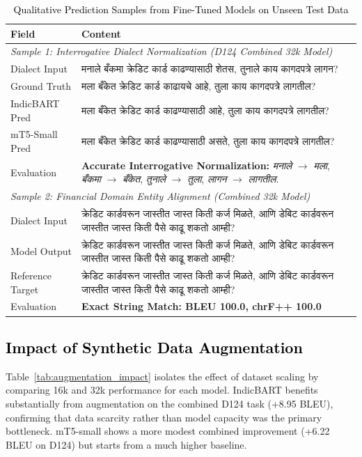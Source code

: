 \begin{table}[t]
\color{black}
\centering
\caption{\textcolor{black}{Qualitative Prediction Samples from Fine-Tuned Models on Unseen Test Data}}
\label{tab:qualitative}
\begin{tabularx}{\textwidth}{lX}
\hline
\textbf{Field} & \textbf{Content} \\
\hline
\multicolumn{2}{l}{\textit{Sample 1: Interrogative Dialect Normalization (D124 Combined 32k Model)}} \\
\hline
Dialect Input & मनाले बँकमा क्रेडिट कार्ड काढण्यासाठी शेतस, तुनाले काय कागदपत्रे लागन? \\
Ground Truth & मला बँकेत क्रेडिट कार्ड काढायचे आहे, तुला काय कागदपत्रे लागतील? \\
IndicBART Pred & मला बँकेत क्रेडिट कार्ड काढण्यासाठी आहे, तुला काय कागदपत्रे लागतील? \\
mT5-Small Pred & मला बँकेत क्रेडिट कार्ड काढण्यासाठी असते, तुला काय कागदपत्रे लागतील? \\
Evaluation & \textbf{Accurate Interrogative Normalization:} \emph{मनाले} $\rightarrow$ \emph{मला}, \emph{बँकमा} $\rightarrow$ \emph{बँकेत}, \emph{तुनाले} $\rightarrow$ \emph{तुला}, \emph{लागन} $\rightarrow$ \emph{लागतील}. \\
\hline
\multicolumn{2}{l}{\textit{Sample 2: Financial Domain Entity Alignment (Combined 32k Model)}} \\
\hline
Dialect Input & क्रेडिट कार्डवरून जास्तीत जास्त किती कर्ज मिळते, आणि डेबिट कार्डवरून जास्तीत जास्त किती पैसे काढू शकतो आम्ही? \\
Model Output & क्रेडिट कार्डवरून जास्तीत जास्त किती कर्ज मिळते, आणि डेबिट कार्डवरून जास्तीत जास्त किती पैसे काढू शकतो आम्ही? \\
Reference Target & क्रेडिट कार्डवरून जास्तीत जास्त किती कर्ज मिळते, आणि डेबिट कार्डवरून जास्तीत जास्त किती पैसे काढू शकतो आम्ही? \\
Evaluation & \textbf{Exact String Match: BLEU 100.0, chrF++ 100.0} \\
\hline
\end{tabularx}
\end{table}

\subsection{\textcolor{black}{Impact of Synthetic Data Augmentation}}

Table~\ref{tab:augmentation_impact} isolates the effect of dataset scaling by comparing 16k and 32k performance for each model. IndicBART benefits substantially from augmentation on the combined D124 task (+8.95 BLEU), confirming that data scarcity rather than model capacity was the primary bottleneck. mT5-small shows a more modest combined improvement (+6.22 BLEU on D124) but starts from a much higher baseline.

